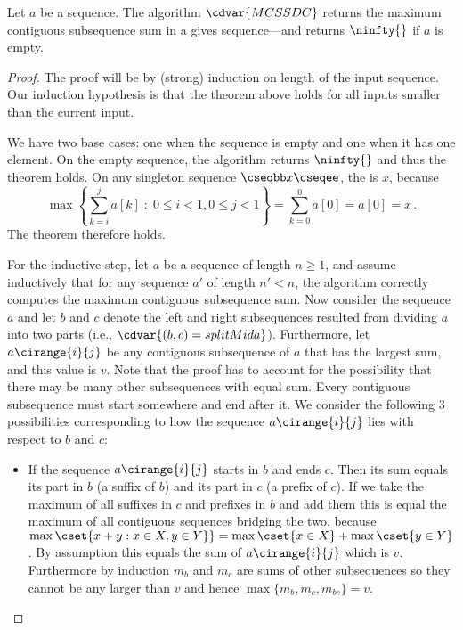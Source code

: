 \begin{flex}
\label{grp:thm:mcss::correctness-of-the-algorithm-mcssdc}

\begin{theorem}
\label{thm:mcss::correctness-of-the-algorithm-mcssdc}
  Let $a$ be a sequence. The algorithm $\cdvar{MCSSDC}$ returns the
  maximum contiguous subsequence sum in a gives sequence---and returns
  $\ninfty{}$ if $a$ is empty.

\end{theorem}

\begin{proof}
\label{prf:mcss::strong}
The proof will be by (strong) induction on length of the input
sequence.  Our induction hypothesis is that the theorem above holds
for all inputs smaller than the current input.

We have two base cases: one when the sequence is empty and one when it
has one element.  
On the empty sequence, the algorithm returns $\ninfty{}$ and thus the
theorem holds.
On any singleton sequence $\cseqbb x \cseqee$, the \MCSS{} is $x$,
because
\[
\max \left\{ \sum_{k=i}^j a[k] \;:\; 0 \leq i <
    1, 0 \leq j < 1 \right\} = \sum_{k=0}^0 a[0] = a[0] = x\,.
\]
The theorem therefore holds.

For the inductive step, let $a$ be a sequence of length $n \ge 1$, and
assume inductively that for any sequence $a'$ of length $n' < n$, the
algorithm correctly computes the maximum contiguous subsequence sum.
Now consider the sequence $a$ and let $b$ and $c$ denote the left and
right subsequences resulted from dividing $a$ into two parts (i.e.,
$\cdvar{(b, c) = splitMid a}$).  
Furthermore, let $a\cirange{i}{j}$ be any contiguous subsequence of $a$
that has the largest sum, and this value is $v$.  
Note that the proof has to account for the possibility that there may
be many other subsequences with equal sum.  
Every contiguous subsequence must start somewhere and end after it.
We consider the following $3$ possibilities corresponding to how the
sequence $a\cirange{i}{j}$ lies with respect to $b$ and $c$:

\begin{itemize}
\item 
If the sequence $a\cirange{i}{j}$ starts in $b$ and ends $c$. Then its
sum equals its part in $b$ (a suffix of $b$) and its part in $c$ (a
prefix of $c$).  
If we take the maximum of all suffixes in $c$ and
prefixes in $b$ and add them this is equal the maximum of all
contiguous sequences bridging the two, because $\max\cset{x + y : x
  \in X, y \in Y\}} = \max\cset{x \in X} + \max\cset{y \in Y}$. 
By assumption this equals the sum of $a\cirange{i}{j}$ which is $v$.
Furthermore by induction $m_b$ and $m_c$ are sums of other
subsequences so they cannot be any larger than $v$ and hence
$\max\{m_b, m_c, m_{bc}\} = v$.



\end{itemize}
\end{proof}
\end{flex}

